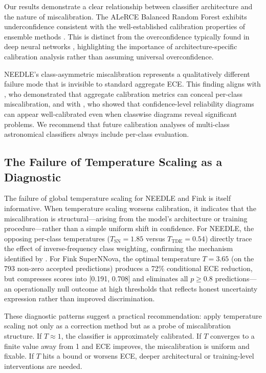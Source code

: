 \documentclass[twocolumn]{aastex631}
\begin{document}
Our results demonstrate a clear relationship between classifier architecture and the nature of miscalibration. The ALeRCE Balanced Random Forest exhibits underconfidence consistent with the well-established calibration properties of ensemble methods \citep{niculescumizil2005, bostrom2008, loecher2024}. This is distinct from the overconfidence typically found in deep neural networks \citep{guo2017}, highlighting the importance of architecture-specific calibration analysis rather than assuming universal overconfidence.

NEEDLE's class-asymmetric miscalibration represents a qualitatively different failure mode that is invisible to standard aggregate ECE. This finding aligns with \citet{nixon2019}, who demonstrated that aggregate calibration metrics can conceal per-class miscalibration, and with \citet{kull2019}, who showed that confidence-level reliability diagrams can appear well-calibrated even when classwise diagrams reveal significant problems. We recommend that future calibration analyses of multi-class astronomical classifiers always include per-class evaluation.

\subsection{The Failure of Temperature Scaling as a Diagnostic}

The failure of global temperature scaling for NEEDLE and Fink is itself informative. When temperature scaling worsens calibration, it indicates that the miscalibration is structural---arising from the model's architecture or training procedure---rather than a simple uniform shift in confidence. For NEEDLE, the opposing per-class temperatures ($T_{\text{SN}} = 1.85$ versus $T_{\text{TDE}} = 0.54$) directly trace the effect of inverse-frequency class weighting, confirming the mechanism identified by \citet{vandengoorbergh2022}. For Fink SuperNNova, the optimal temperature $T = 3.65$ (on the 793 non-zero accepted predictions) produces a 72\% conditional ECE reduction, but compresses scores into [0.191, 0.708] and eliminates all $p \ge 0.8$ predictions---an operationally null outcome at high thresholds that reflects honest uncertainty expression rather than improved discrimination.

These diagnostic patterns suggest a practical recommendation: apply temperature scaling not only as a correction method but as a probe of miscalibration structure. If $T \approx 1$, the classifier is approximately calibrated. If $T$ converges to a finite value away from 1 and ECE improves, the miscalibration is uniform and fixable. If $T$ hits a bound or worsens ECE, deeper architectural or training-level interventions are needed.
\end{document}
